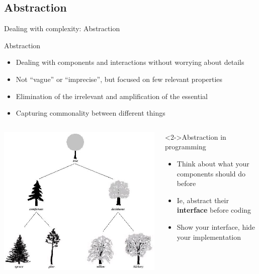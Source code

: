 \subsection{Abstraction}
\begin{frame}{Dealing with complexity: Abstraction}
  \begin{block}{Abstraction}
    \begin{itemize}
    \item Dealing with components and interactions without worrying
      about details
    \item Not ``vague'' or ``imprecise'', but focused on few relevant properties
    \item Elimination of the irrelevant and amplification of the
      essential
    \item Capturing commonality between different things
    \end{itemize}
  \end{block}

  \begin{columns}
    \begin{column}{.3\linewidth}
      \includegraphics[width=\linewidth]{fig/algo_abstracting_trees.png}      
    \end{column}

    \begin{column}{.7\linewidth}
      \begin{block}<2->{Abstraction in programming}
        \begin{itemize}
        \item Think about what your components should do before
        \item Ie, abstract their \textbf{interface} before coding
        \item Show your interface, hide your implementation
        \end{itemize}
      \end{block}
    \end{column}
  \end{columns}
  

\end{frame}
